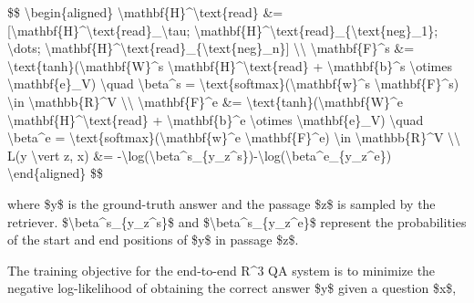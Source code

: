 \$\$ \textbackslash begin\{aligned\} \textbackslash mathbf\{H\}\^{}\textbackslash text\{read\} \&= {[}\textbackslash mathbf\{H\}\^{}\textbackslash text\{read\}\_\textbackslash tau; \textbackslash mathbf\{H\}\^{}\textbackslash text\{read\}\_\{\textbackslash text\{neg\}\_1\}; \textbackslash dots; \textbackslash mathbf\{H\}\^{}\textbackslash text\{read\}\_\{\textbackslash text\{neg\}\_n\}{]} \textbackslash\textbackslash{} \textbackslash mathbf\{F\}\^{}s \&= \textbackslash text\{tanh\}(\textbackslash mathbf\{W\}\^{}s \textbackslash mathbf\{H\}\^{}\textbackslash text\{read\} + \textbackslash mathbf\{b\}\^{}s \textbackslash otimes \textbackslash mathbf\{e\}\_V) \textbackslash quad \textbackslash beta\^{}s = \textbackslash text\{softmax\}(\textbackslash mathbf\{w\}\^{}s \textbackslash mathbf\{F\}\^{}s) \textbackslash in \textbackslash mathbb\{R\}\^{}V \textbackslash\textbackslash{} \textbackslash mathbf\{F\}\^{}e \&= \textbackslash text\{tanh\}(\textbackslash mathbf\{W\}\^{}e \textbackslash mathbf\{H\}\^{}\textbackslash text\{read\} + \textbackslash mathbf\{b\}\^{}e \textbackslash otimes \textbackslash mathbf\{e\}\_V) \textbackslash quad \textbackslash beta\^{}e = \textbackslash text\{softmax\}(\textbackslash mathbf\{w\}\^{}e \textbackslash mathbf\{F\}\^{}e) \textbackslash in \textbackslash mathbb\{R\}\^{}V \textbackslash\textbackslash{} L(y \textbackslash vert z, x) \&= -\textbackslash log(\textbackslash beta\^{}s\_\{y\_z\^{}s\})-\textbackslash log(\textbackslash beta\^{}e\_\{y\_z\^{}e\}) \textbackslash end\{aligned\} \$\$

where \$y\$ is the ground-truth answer and the passage \$z\$ is sampled by the retriever. \$\textbackslash beta\^{}s\_\{y\_z\^{}s\}\$ and \$\textbackslash beta\^{}s\_\{y\_z\^{}e\}\$ represent the probabilities of the start and end positions of \$y\$ in passage \$z\$.

The training objective for the end-to-end R\^{}3 QA system is to minimize the negative log-likelihood of obtaining the correct answer \$y\$ given a question \$x\$,

